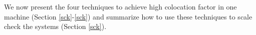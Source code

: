 \section{\sck}

We now present the four \sck techniques to achieve high colocation factor in one
machine (Section \ref{sck}-\ref{sck}) and summarize how to use these techniques
to scale check the systems (Section \ref{sck}).




